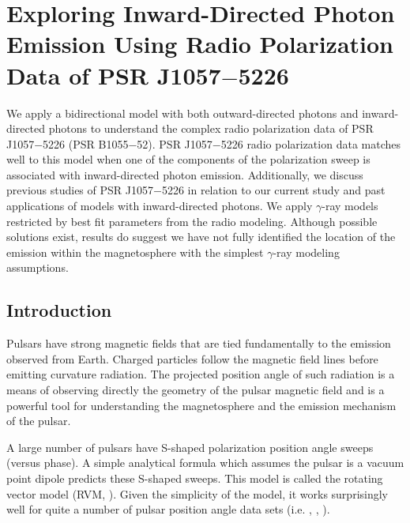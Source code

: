 \section{Exploring Inward-Directed Photon Emission Using Radio Polarization Data of PSR J1057$-$5226}




We apply a bidirectional model with both outward-directed photons
and inward-directed photons to understand the complex
radio polarization data of PSR J1057$-$5226 (PSR B1055$-$52).
PSR J1057$-$5226 radio polarization data matches well to
this model  when one of the
components of the polarization sweep is associated with
inward-directed photon emission.
Additionally, we discuss previous studies
of PSR J1057$-$5226 in relation to our current study
and past applications of models with inward-directed photons.
We apply $\gamma$-ray models restricted by best fit parameters
from the radio modeling.  Although possible solutions exist, results
do suggest we have not fully identified the
location of the emission within the magnetosphere with the
simplest $\gamma$-ray modeling assumptions.


\subsection{Introduction}

Pulsars have strong magnetic fields that are tied fundamentally to the
emission observed from Earth.  Charged particles follow the magnetic
field lines before emitting curvature radiation.  The projected
position angle of such radiation is a means of observing directly
the geometry of the pulsar magnetic field and is a powerful
tool for understanding the magnetosphere and the emission
mechanism of the pulsar.

A large number of pulsars have S-shaped polarization
position angle sweeps (versus phase).
A simple analytical formula which assumes the pulsar
is a vacuum point dipole
predicts these S-shaped sweeps.
This model
is called the rotating vector model (RVM, \citealp{radhakrishnan1969magnetic}).
Given the simplicity of
the model, it works surprisingly well for quite a number of
pulsar position angle data sets
(i.e. \citealp{lyne1988shape}, \citealp{phillips1990magnetic}, \citealp{everett2001emission}).

